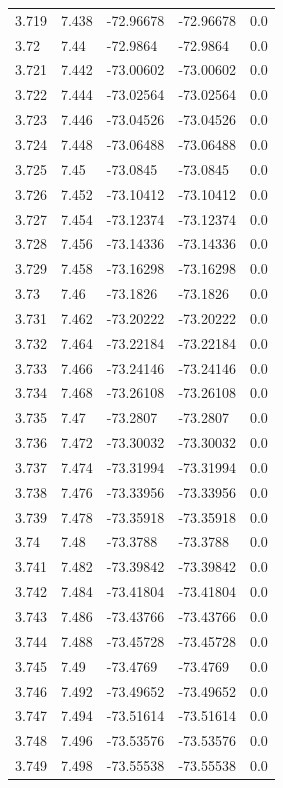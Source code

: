 \begin{tabular}{lllll}
3.719 & 7.438 & -72.96678 & -72.96678 & 0.0 \\
3.72 & 7.44 & -72.9864 & -72.9864 & 0.0 \\
3.721 & 7.442 & -73.00602 & -73.00602 & 0.0 \\
3.722 & 7.444 & -73.02564 & -73.02564 & 0.0 \\
3.723 & 7.446 & -73.04526 & -73.04526 & 0.0 \\
3.724 & 7.448 & -73.06488 & -73.06488 & 0.0 \\
3.725 & 7.45 & -73.0845 & -73.0845 & 0.0 \\
3.726 & 7.452 & -73.10412 & -73.10412 & 0.0 \\
3.727 & 7.454 & -73.12374 & -73.12374 & 0.0 \\
3.728 & 7.456 & -73.14336 & -73.14336 & 0.0 \\
3.729 & 7.458 & -73.16298 & -73.16298 & 0.0 \\
3.73 & 7.46 & -73.1826 & -73.1826 & 0.0 \\
3.731 & 7.462 & -73.20222 & -73.20222 & 0.0 \\
3.732 & 7.464 & -73.22184 & -73.22184 & 0.0 \\
3.733 & 7.466 & -73.24146 & -73.24146 & 0.0 \\
3.734 & 7.468 & -73.26108 & -73.26108 & 0.0 \\
3.735 & 7.47 & -73.2807 & -73.2807 & 0.0 \\
3.736 & 7.472 & -73.30032 & -73.30032 & 0.0 \\
3.737 & 7.474 & -73.31994 & -73.31994 & 0.0 \\
3.738 & 7.476 & -73.33956 & -73.33956 & 0.0 \\
3.739 & 7.478 & -73.35918 & -73.35918 & 0.0 \\
3.74 & 7.48 & -73.3788 & -73.3788 & 0.0 \\
3.741 & 7.482 & -73.39842 & -73.39842 & 0.0 \\
3.742 & 7.484 & -73.41804 & -73.41804 & 0.0 \\
3.743 & 7.486 & -73.43766 & -73.43766 & 0.0 \\
3.744 & 7.488 & -73.45728 & -73.45728 & 0.0 \\
3.745 & 7.49 & -73.4769 & -73.4769 & 0.0 \\
3.746 & 7.492 & -73.49652 & -73.49652 & 0.0 \\
3.747 & 7.494 & -73.51614 & -73.51614 & 0.0 \\
3.748 & 7.496 & -73.53576 & -73.53576 & 0.0 \\
3.749 & 7.498 & -73.55538 & -73.55538 & 0.0 \\

\end{tabular}
